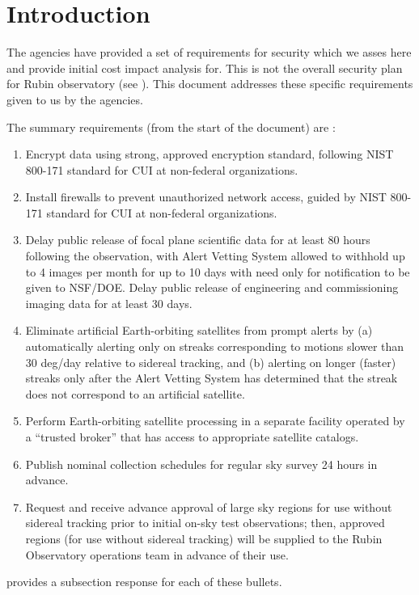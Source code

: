 \section{Introduction}

The agencies have provided a set of requirements for security which we asses here and provide initial cost impact analysis for.  This is not the overall security plan for Rubin observatory (see ).
This document addresses these specific requirements given to us by the agencies.

The summary requirements (from the start of the document) are :
\begin{enumerate}

\item	Encrypt data using strong, approved encryption standard, following NIST 800-171 standard for CUI at non-federal organizations.
\item	Install firewalls to prevent unauthorized network access, guided by NIST 800-171 standard for CUI at non-federal organizations.
\item	Delay public release of focal plane scientific data for at least 80 hours following the observation, with Alert Vetting System allowed to withhold up to 4 images per month for up to 10 days with need only for notification to be given to NSF/DOE. Delay public release of engineering and commissioning imaging data for at least 30 days.
\item	Eliminate artificial Earth-orbiting satellites from prompt alerts by (a) automatically alerting only on streaks corresponding to motions slower than 30 deg/day relative to sidereal tracking, and (b) alerting on longer (faster) streaks only after the Alert Vetting System has determined that the streak does not correspond to an artificial satellite.
\item	Perform Earth-orbiting satellite processing in a separate facility operated by a “trusted broker” that has access to appropriate satellite catalogs.
\item	Publish nominal collection schedules for regular sky survey 24 hours in advance.
\item	Request and receive advance approval of large sky regions for use without sidereal tracking prior to initial on-sky test observations; then, approved regions (for use without sidereal tracking) will be supplied to the Rubin Observatory operations team in advance of their use.

\end{enumerate}


 provides a subsection response for each of these bullets.
